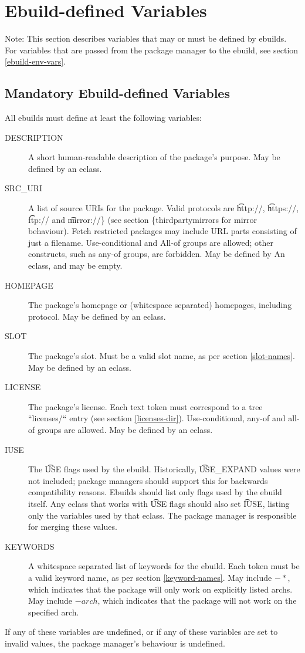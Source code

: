 \chapter{Ebuild-defined Variables}

Note: This section describes variables that may or must be defined by ebuilds. For variables that
are passed from the package manager to the ebuild, see section \ref{ebuild-env-vars}.

\section{Mandatory Ebuild-defined Variables}

All ebuilds must define at least the following variables:

\begin{description}
\item[DESCRIPTION] A short human-readable description of the package's purpose. May be defined by an
    eclass.
\item[SRC\_URI] A list of source URIs for the package. Valid protocols are \t{http://},
    \t{https://}, \t{ftp://} and \t{mirror://\} (see section \{thirdpartymirrors} for mirror behaviour).
    Fetch restricted packages may include URL parts consisting of just a filename.  Use-conditional and
    All-of groups are allowed; other constructs, such as any-of groups, are forbidden. May be defined by
    An eclass, and may be empty.
\item[HOMEPAGE] The package's homepage or (whitespace separated) homepages, including protocol. May
    be defined by an eclass.
\item[SLOT] The package's slot. Must be a valid slot name, as per section \ref{slot-names}. May
    be defined by an eclass.
\item[LICENSE] The package's license. Each text token must correspond to a tree ``licenses/`` entry
    (see section \ref{licenses-dir}). Use-conditional, any-of and all-of groups are allowed.
    May be defined by an eclass.
\item[IUSE] The \t{USE} flags used by the ebuild. Historically, \t{USE\_EXPAND} values were not
    included; package managers should support this for backwards compatibility reasons. Ebuilds
    should list only flags used by the ebuild itself. Any eclass that works with \t{USE} flags
    should also set \t{IUSE}, listing only the variables used by that eclass. The package manager is
    responsible for merging these values.
\item[KEYWORDS] A whitespace separated list of keywords for the ebuild. Each token must be a
    valid keyword name, as per section \ref{keyword-names}. May include $-*$, which
    indicates that the package will only work on explicitly listed archs. May include $-arch$,
    which indicates that the package will not work on the specified arch.
\end{description}

If any of these variables are undefined, or if any of these variables are set to invalid values,
the package manager's behaviour is undefined.

